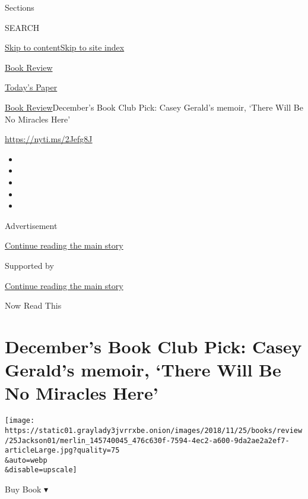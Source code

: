 Sections

SEARCH

\protect\hyperlink{site-content}{Skip to
content}\protect\hyperlink{site-index}{Skip to site index}

\href{https://www.nytimes3xbfgragh.onion/section/books/review}{Book
Review}

\href{https://myaccount.nytimes3xbfgragh.onion/auth/login?response_type=cookie\&client_id=vi}{}

\href{https://www.nytimes3xbfgragh.onion/section/todayspaper}{Today's
Paper}

\href{/section/books/review}{Book Review}\textbar{}December's Book Club
Pick: Casey Gerald's memoir, `There Will Be No Miracles Here'

\url{https://nyti.ms/2Jefg8J}

\begin{itemize}
\item
\item
\item
\item
\item
\end{itemize}

Advertisement

\protect\hyperlink{after-top}{Continue reading the main story}

Supported by

\protect\hyperlink{after-sponsor}{Continue reading the main story}

Now Read This

\hypertarget{decembers-book-club-pick-casey-geralds-memoir-there-will-be-no-miracles-here}{%
\section{December's Book Club Pick: Casey Gerald's memoir, `There Will
Be No Miracles
Here'}\label{decembers-book-club-pick-casey-geralds-memoir-there-will-be-no-miracles-here}}

\texttt{[image: https://static01.graylady3jvrrxbe.onion/images/2018/11/25/books/review/25Jackson01/merlin\_145740045\_476c630f-7594-4ec2-a600-9da2ae2a2ef7-articleLarge.jpg?quality=75\\\&auto=webp\\\&disable=upscale]}

Buy Book ▾

